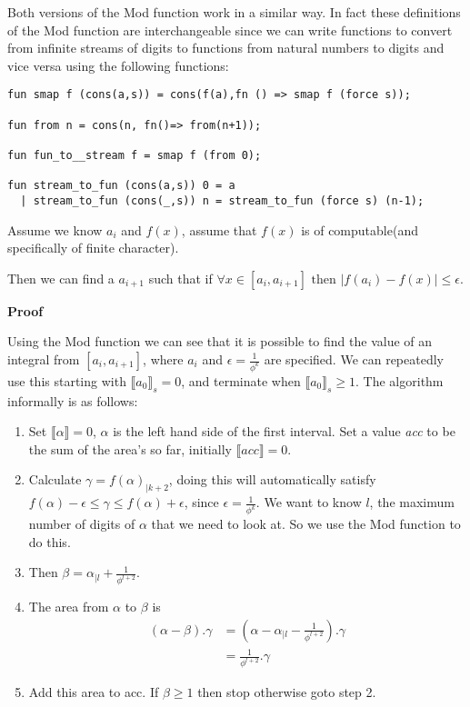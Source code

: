 \documentclass{cs4rep}
\begin{document}
Both versions of the Mod function work in a similar way. In fact these
definitions of the Mod function are interchangeable since we can write
functions to convert from infinite streams of digits to functions from
natural numbers to digits and vice versa using the following
functions:

\begin{verbatim}
fun smap f (cons(a,s)) = cons(f(a),fn () => smap f (force s));

fun from n = cons(n, fn()=> from(n+1));

fun fun_to__stream f = smap f (from 0);

fun stream_to_fun (cons(a,s)) 0 = a
  | stream_to_fun (cons(_,s)) n = stream_to_fun (force s) (n-1);
\end{verbatim}

\begin{myprop}
  Assume we know $a_{i}$ and $f(x)$, assume that $f(x)$ is of
  computable(and specifically of finite character).
  
  Then we can find a $a_{i+1}$ such that if $\forall x \in
  [a_{i},a_{i+1}] \mbox{ then } |f(a_{i})-f(x)| \leq \epsilon$.
\end{myprop}

{\bf Proof}

Using the Mod function we can see that it is possible to find the
value of an integral from $[a_{i}, a_{i+1}]$, where $a_{i}$ and
$\epsilon = \frac{1}{\phi^{k}}$ are specified. We can repeatedly use
this starting with $\llbracket a_{0} \rrbracket_{s} = 0$, and
terminate when $\llbracket a_{0} \rrbracket_{s} \geq 1$. The algorithm
informally is as follows:

\begin{enumerate}
\item Set $ \llbracket \alpha \rrbracket = 0$, $ \alpha $ is the left
  hand side of the first interval. Set a value {\em acc} to be the sum
  of the area's so far, initially $ \llbracket acc \rrbracket = 0$.
\item Calculate $ \gamma = f(\alpha)_{|k+2} $, doing this will
  automatically satisfy $ f(\alpha) - \epsilon \leq \gamma \leq
  f(\alpha) + \epsilon $, since $ \epsilon = \frac{1}{\phi^{k}} $. We
  want to know $ l $, the maximum number of digits of $ \alpha $ that we
  need to look at. So we use the Mod function to do this.
\item Then $ \beta = \alpha_{|l}+ \frac{1}{\phi^{l+2}} $.
\item The area from $ \alpha $ to $ \beta $ is \[ \begin{array}{rl}
    (\alpha - \beta).\gamma & = (\alpha - \alpha_{|l} - \frac{1}{\phi^{l+2}}).\gamma \\
    & = \frac{1}{\phi^{l+2}}.\gamma
\end{array} \]
\item Add this area to acc. If $\beta \geq 1$ then stop otherwise goto
  step 2.
\end{enumerate}
\end{document}
